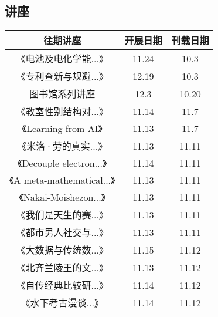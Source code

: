 \documentclass[letterpaper, 12pt]{article}
\begin{document}
\begin{multicols}{2}

\section{讲座}
\begin{tabular}{|c|c|c|}
    \hline
    往期讲座 & 开展日期 & 刊载日期\\
    \hline\hline
    《电池及电化学能...》 & 11.24 & 10.3\\
    《专利查新与规避...》 & 12.19 & 10.3\\
    图书馆系列讲座 & 12.3 & 10.20\\
    《教室性别结构对...》 & 11.14 & 11.7\\
    《Learning from AI》 & 11.13 & 11.7\\
    《米洛·劳的真实...》 & 11.13 & 11.11\\
    《Decouple electron...》 & 11.14 & 11.11\\
    《A meta-mathematical...》 & 11.13 & 11.11\\
    《Nakai-Moishezon...》 & 11.13 & 11.11\\
    《我们是天生的赛...》 & 11.13 & 11.11\\
    《都市男人社交与...》 & 11.13 & 11.11\\
    《大数据与传统数...》 & 11.15 & 11.12\\
    《北齐兰陵王的文...》 & 11.13 & 11.12\\
    《自传经典比较研...》 & 11.14 & 11.12\\
    《水下考古漫谈...》 & 11.14 & 11.12\\
    
    \hline
\end{tabular}


\end{multicols}
\end{document}
